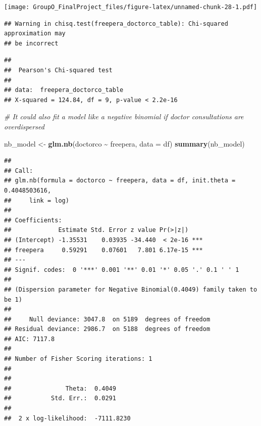 \documentclass[
]{article}
\newenvironment{Shaded}{\begin{snugshade}}{\end{snugshade}}
\newcommand{\AttributeTok}[1]{\textcolor[rgb]{0.13,0.29,0.53}{#1}}
\newcommand{\CommentTok}[1]{\textcolor[rgb]{0.56,0.35,0.01}{\textit{#1}}}
\newcommand{\FunctionTok}[1]{\textcolor[rgb]{0.13,0.29,0.53}{\textbf{#1}}}
\newcommand{\NormalTok}[1]{#1}
\newcommand{\OtherTok}[1]{\textcolor[rgb]{0.56,0.35,0.01}{#1}}
\newcommand{\SpecialCharTok}[1]{\textcolor[rgb]{0.81,0.36,0.00}{\textbf{#1}}}
\begin{document}
\texttt{[image: GroupO\_FinalProject\_files/figure-latex/unnamed-chunk-28-1.pdf]}

\begin{Shaded}
\end{Shaded}

\begin{verbatim}
## Warning in chisq.test(freepera_doctorco_table): Chi-squared approximation may
## be incorrect
\end{verbatim}

\begin{verbatim}
## 
##  Pearson's Chi-squared test
## 
## data:  freepera_doctorco_table
## X-squared = 124.84, df = 9, p-value < 2.2e-16
\end{verbatim}

\begin{Shaded}
\begin{Highlighting}[]
\CommentTok{\# It could also fit a model like a negative binomial if doctor consultations are overdispersed}

\NormalTok{nb\_model }\OtherTok{\textless{}{-}} \FunctionTok{glm.nb}\NormalTok{(doctorco }\SpecialCharTok{\textasciitilde{}}\NormalTok{ freepera, }\AttributeTok{data =}\NormalTok{ df)}
\FunctionTok{summary}\NormalTok{(nb\_model)}
\end{Highlighting}
\end{Shaded}

\begin{verbatim}
## 
## Call:
## glm.nb(formula = doctorco ~ freepera, data = df, init.theta = 0.4048503616, 
##     link = log)
## 
## Coefficients:
##             Estimate Std. Error z value Pr(>|z|)    
## (Intercept) -1.35531    0.03935 -34.440  < 2e-16 ***
## freepera     0.59291    0.07601   7.801 6.17e-15 ***
## ---
## Signif. codes:  0 '***' 0.001 '**' 0.01 '*' 0.05 '.' 0.1 ' ' 1
## 
## (Dispersion parameter for Negative Binomial(0.4049) family taken to be 1)
## 
##     Null deviance: 3047.8  on 5189  degrees of freedom
## Residual deviance: 2986.7  on 5188  degrees of freedom
## AIC: 7117.8
## 
## Number of Fisher Scoring iterations: 1
## 
## 
##               Theta:  0.4049 
##           Std. Err.:  0.0291 
## 
##  2 x log-likelihood:  -7111.8230
\end{verbatim}
\end{document}
